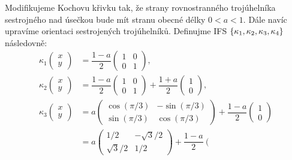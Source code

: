 \begin{example}\label{ex:modifikovana-kochova-krivka}
    Modifikujeme Kochovu křivku tak, že strany rovnostranného trojúhelníka sestrojného nad úsečkou bude mít stranu obecné délky $0<a<1$. Dále navíc upravíme orientaci sestrojených trojúhelníků. Definujme IFS $\left\{\kappa_1,\kappa_2,\kappa_3,\kappa_4\right\}$ následovně:
    \begin{align*}
        \kappa_1\left(\begin{matrix}
            x\\
            y
        \end{matrix}\right)&=\dfrac{1-a}{2}\left(\begin{matrix}
            1 & 0\\
            0 & 1
        \end{matrix}\right),\\
        \kappa_2\left(\begin{matrix}
            x\\
            y
        \end{matrix}\right)&=\dfrac{1-a}{2}\left(\begin{matrix}
            1 & 0\\
            0 & 1
        \end{matrix}\right)+\dfrac{1+a}{2}\left(\begin{matrix}
            1\\
            0
        \end{matrix}\right),\\
        \kappa_3\left(\begin{matrix}
            x\\
            y
        \end{matrix}\right)&=a\left(\begin{matrix}
            \cos(\pi/3) & -\sin(\pi/3)\\
            \sin(\pi/3) & \cos(\pi/3)
        \end{matrix}\right)+\dfrac{1-a}{2}\left(\begin{matrix}
            1\\
            0
        \end{matrix}\right)\\
        &=a\left(\begin{matrix}
            1/2 & -\sqrt{3}/2\\
            \sqrt{3}/2 & 1/2
        \end{matrix}\right)+\dfrac{1-a}{2}\left(\begin{matrix}

\end{matrix}
\end{align*}
\end{example}
